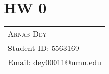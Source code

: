 \section{HW 0}
\begin{tabularx}{\textwidth}{l}
	\hspace*{-0.8cm}\large\textsc{Arnab Dey}\\
	\hspace*{-0.8cm}Student ID: 5563169\\
	\hspace*{-0.8cm}Email: dey00011@umn.edu\\
\end{tabularx}
\bigskip
\par